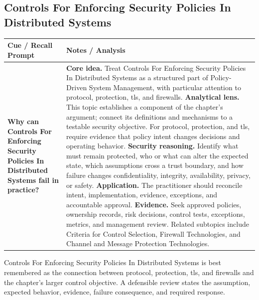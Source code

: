 \documentclass[11pt]{article}
\newcommand{\CornellHeader}{%
\rowcolor{Navy}\color{white}\bfseries Cue / Recall Prompt & \color{white}\bfseries Notes / Analysis\\\hline}
\newcommand{\CornellRow}[2]{%
\cellcolor{CueGray}\RaggedRight\textbf{#1} & \RaggedRight #2\\\hline}
\begin{document}
\subsection*{Controls For Enforcing Security Policies In Distributed Systems}
\begin{longtable}{>{\RaggedRight\arraybackslash}p{}|>{\RaggedRight\arraybackslash}p{}}
\CornellHeader
\CornellRow{Why can Controls For Enforcing Security Policies In Distributed Systems fail in practice?}{\textbf{Core idea.} Treat Controls For Enforcing Security Policies In Distributed Systems as a structured part of Policy-Driven System Management, with particular attention to protocol, protection, tls, and firewalls. \textbf{Analytical lens.} This topic establishes a component of the chapter's argument; connect its definitions and mechanisms to a testable security objective. For protocol, protection, and tls, require evidence that policy intent changes decisions and operating behavior. \textbf{Security reasoning.} Identify what must remain protected, who or what can alter the expected state, which assumptions cross a trust boundary, and how failure changes confidentiality, integrity, availability, privacy, or safety. \textbf{Application.} The practitioner should reconcile intent, implementation, evidence, exceptions, and accountable approval. \textbf{Evidence.} Seek approved policies, ownership records, risk decisions, control tests, exceptions, metrics, and management review. Related subtopics include Criteria for Control Selection, Firewall Technologies, and Channel and Message Protection Technologies.}
\end{longtable}
\begin{topicsummary}
Controls For Enforcing Security Policies In Distributed Systems is best remembered as the connection between protocol, protection, tls, and firewalls and the chapter's larger control objective. A defensible review states the assumption, expected behavior, evidence, failure consequence, and required response.
\end{topicsummary}
\end{document}

